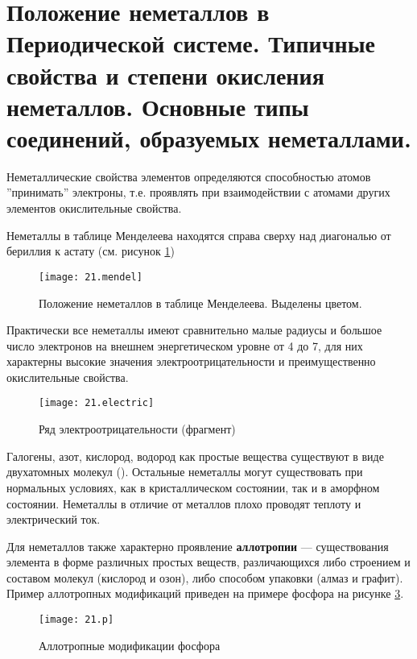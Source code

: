 \section{Положение неметаллов в Периодической системе. Типичные свойства и степени окисления неметаллов. Основные типы соединений, образуемых неметаллами.}

Неметаллические свойства элементов определяются способностью атомов ''принимать'' электроны, т.е. проявлять при взаимодействии с атомами других элементов окислительные свойства.

Неметаллы в таблице Менделеева находятся справа сверху над диагональю от бериллия к астату (см. рисунок \ref{fig:21.mendel})

\begin{figure}[H]
	\centering
	\texttt{[image: 21.mendel]}
	\caption{Положение неметаллов в таблице Менделеева. Выделены цветом.}
	\label{fig:21.mendel}
\end{figure}

Практически все неметаллы имеют сравнительно малые радиусы и большое число электронов на внешнем энергетическом уровне от 4 до 7, для них характерны высокие значения электроотрицательности и преимущественно окислительные свойства.

\begin{figure}[H]
	\centering
	\texttt{[image: 21.electric]}
	\caption{Ряд электроотрицательности (фрагмент)}
	\label{fig:21.electric}
\end{figure}


Галогены, азот, кислород, водород как простые вещества существуют в виде двухатомных молекул (). Остальные неметаллы могут существовать при нормальных условиях, как в кристаллическом состоянии, так и в аморфном состоянии. Неметаллы в отличие от металлов плохо проводят теплоту и электрический ток.

Для неметаллов также характерно проявление \textbf{аллотропии} --- существования элемента в форме различных простых веществ, различающихся либо строением и составом молекул (кислород и озон), либо способом упаковки (алмаз и графит). Пример аллотропных модификаций приведен на примере фосфора на рисунке \ref{fig:21.p}.

\begin{figure}[H]
	\centering
	\texttt{[image: 21.p]}
	\caption{Аллотропные модификации фосфора}
	\label{fig:21.p}
\end{figure}


